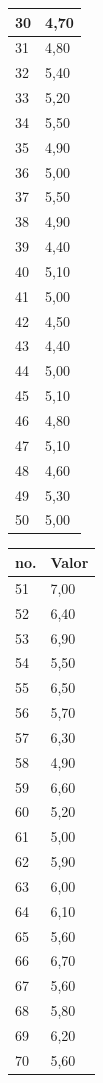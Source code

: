 \begin{table}[!ht]
\begin{tabular}{ |l|l| }
30	&	4,70	\\ \hline
31	&	4,80	\\ \hline
32	&	5,40	\\ \hline
33	&	5,20	\\ \hline
34	&	5,50	\\ \hline
35	&	4,90	\\ \hline
36	&	5,00	\\ \hline
37	&	5,50	\\ \hline
38	&	4,90	\\ \hline
39	&	4,40	\\ \hline
40	&	5,10	\\ \hline
41	&	5,00	\\ \hline
42	&	4,50	\\ \hline
43	&	4,40	\\ \hline
44	&	5,00	\\ \hline
45	&	5,10	\\ \hline
46	&	4,80	\\ \hline
47	&	5,10	\\ \hline
48	&	4,60	\\ \hline
49	&	5,30	\\ \hline
50	&	5,00	\\ \hline
\end{tabular}
\begin{tabular}{ |l|l| }
\hline
 no. & Valor \\ \hline
51	&	7,00	\\ \hline
52	&	6,40	\\ \hline
53	&	6,90	\\ \hline
54	&	5,50	\\ \hline
55	&	6,50	\\ \hline
56	&	5,70	\\ \hline
57	&	6,30	\\ \hline
58	&	4,90	\\ \hline
59	&	6,60	\\ \hline
60	&	5,20	\\ \hline
61	&	5,00	\\ \hline
62	&	5,90	\\ \hline
63	&	6,00	\\ \hline
64	&	6,10	\\ \hline
65	&	5,60	\\ \hline
66	&	6,70	\\ \hline
67	&	5,60	\\ \hline
68	&	5,80	\\ \hline
69	&	6,20	\\ \hline
70	&	5,60	\\ \hline

\end{tabular}
\end{table}
